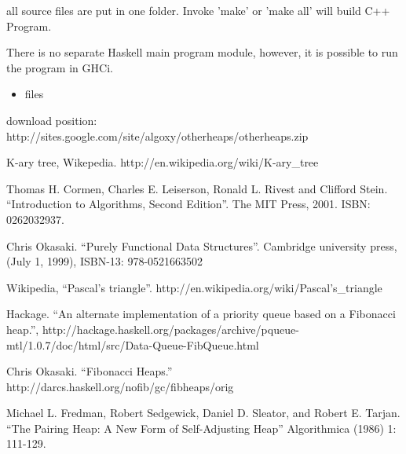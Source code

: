 \documentclass{article}
\begin{document}
all source files are put in one folder. Invoke 'make' or 'make all'
will build C++ Program. 

There is no separate Haskell main program module, however, it is possible to run the program in GHCi.

\begin{itemize}
\item files

\end{itemize}

download position: http://sites.google.com/site/algoxy/otherheaps/otherheaps.zip

\begin{thebibliography}{99}

K-ary tree, Wikepedia. http://en.wikipedia.org/wiki/K-ary\_tree

Thomas H. Cormen, Charles E. Leiserson, Ronald L. Rivest and Clifford Stein. ``Introduction to Algorithms, Second Edition''. The MIT Press, 2001. ISBN: 0262032937.

Chris Okasaki. ``Purely Functional Data Structures''. Cambridge university press, (July 1, 1999), ISBN-13: 978-0521663502

Wikipedia, ``Pascal's triangle''. http://en.wikipedia.org/wiki/Pascal's\_triangle

Hackage. ``An alternate implementation of a priority queue based on a Fibonacci heap.'', http://hackage.haskell.org/packages/archive/pqueue-mtl/1.0.7/doc/html/src/Data-Queue-FibQueue.html

Chris Okasaki. ``Fibonacci Heaps.'' http://darcs.haskell.org/nofib/gc/fibheaps/orig

Michael L. Fredman, Robert Sedgewick, Daniel D. Sleator, and Robert E. Tarjan. ``The Pairing Heap: A New Form of Self-Adjusting Heap'' Algorithmica (1986) 1: 111-129.

\end{thebibliography}

\ifx\wholebook\relax \else
\end{document}
